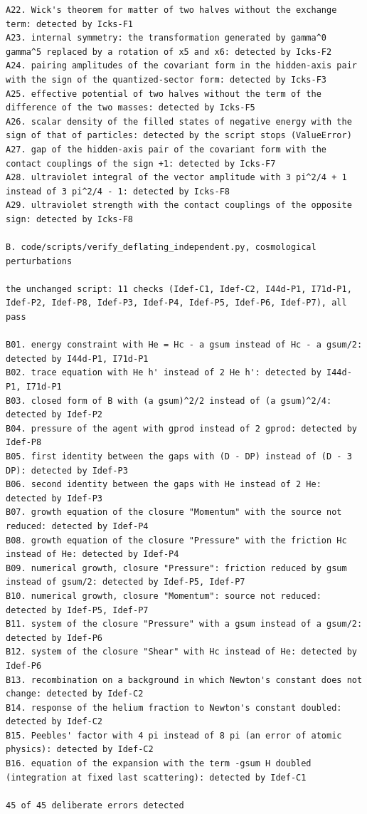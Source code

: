 \documentclass[
  10pt,
]{article}
\begin{document}
\begin{verbatim}
A22. Wick's theorem for matter of two halves without the exchange term: detected by Icks-F1
A23. internal symmetry: the transformation generated by gamma^0 gamma^5 replaced by a rotation of x5 and x6: detected by Icks-F2
A24. pairing amplitudes of the covariant form in the hidden-axis pair with the sign of the quantized-sector form: detected by Icks-F3
A25. effective potential of two halves without the term of the difference of the two masses: detected by Icks-F5
A26. scalar density of the filled states of negative energy with the sign of that of particles: detected by the script stops (ValueError)
A27. gap of the hidden-axis pair of the covariant form with the contact couplings of the sign +1: detected by Icks-F7
A28. ultraviolet integral of the vector amplitude with 3 pi^2/4 + 1 instead of 3 pi^2/4 - 1: detected by Icks-F8
A29. ultraviolet strength with the contact couplings of the opposite sign: detected by Icks-F8

B. code/scripts/verify_deflating_independent.py, cosmological perturbations

the unchanged script: 11 checks (Idef-C1, Idef-C2, I44d-P1, I71d-P1, Idef-P2, Idef-P8, Idef-P3, Idef-P4, Idef-P5, Idef-P6, Idef-P7), all pass

B01. energy constraint with He = Hc - a gsum instead of Hc - a gsum/2: detected by I44d-P1, I71d-P1
B02. trace equation with He h' instead of 2 He h': detected by I44d-P1, I71d-P1
B03. closed form of B with (a gsum)^2/2 instead of (a gsum)^2/4: detected by Idef-P2
B04. pressure of the agent with gprod instead of 2 gprod: detected by Idef-P8
B05. first identity between the gaps with (D - DP) instead of (D - 3 DP): detected by Idef-P3
B06. second identity between the gaps with He instead of 2 He: detected by Idef-P3
B07. growth equation of the closure "Momentum" with the source not reduced: detected by Idef-P4
B08. growth equation of the closure "Pressure" with the friction Hc instead of He: detected by Idef-P4
B09. numerical growth, closure "Pressure": friction reduced by gsum instead of gsum/2: detected by Idef-P5, Idef-P7
B10. numerical growth, closure "Momentum": source not reduced: detected by Idef-P5, Idef-P7
B11. system of the closure "Pressure" with a gsum instead of a gsum/2: detected by Idef-P6
B12. system of the closure "Shear" with Hc instead of He: detected by Idef-P6
B13. recombination on a background in which Newton's constant does not change: detected by Idef-C2
B14. response of the helium fraction to Newton's constant doubled: detected by Idef-C2
B15. Peebles' factor with 4 pi instead of 8 pi (an error of atomic physics): detected by Idef-C2
B16. equation of the expansion with the term -gsum H doubled (integration at fixed last scattering): detected by Idef-C1

45 of 45 deliberate errors detected
\end{verbatim}
\end{document}
